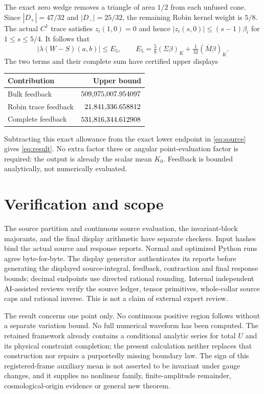 \documentclass[11pt]{article}
\begin{document}
The exact zero wedge removes a triangle of area $1/2$ from each unfused
cone. Since $|D_+|=47/32$ and $|D_-|=25/32$, the remaining Robin kernel
weight is $5/8$. The actual $C^1$ trace satisfies $z_i(1,0)=0$ and hence
$|z_i(s,0)|\le(s-1)\beta_i$ for $1\le s\le5/4$. It follows that
\[
|\lambda(W-S)(a,b)|\le E_5,
\qquad E_5=\tfrac58(\Sigma\beta)_K+\tfrac1{32}(\overline M\beta)_K.
\]
The two terms and their complete sum have certified upper displays
\begin{center}
\begin{tabular}{lr}\toprule
Contribution & Upper bound\\\midrule
Bulk feedback & $509{,}975{,}007.954097$\\
Robin trace feedback & $21{,}841{,}336.658812$\\
Complete feedback & $531{,}816{,}344.612908$\\\bottomrule
\end{tabular}
\end{center}
Subtracting this exact allowance from the exact lower endpoint in
\eqref{eq:source} gives \eqref{eq:result}. No extra factor three or angular
point-evaluation factor is required: the output is already the scalar mean
$K_0$. Feedback is bounded analytically, not numerically evaluated.

\section{Verification and scope}
The source partition and continuous source evaluation, the invariant-block
majorants, and the final display arithmetic have separate checkers. Input
hashes bind the actual source and response reports. Normal and optimized
Python runs agree byte-for-byte. The display generator authenticates its
reports before generating the displayed source-integral, feedback,
contraction and final response bounds;
decimal endpoints use directed rational rounding. Internal independent
AI-assisted reviews verify the source ledger, tensor primitives, whole-collar
source caps and rational inverse. This is not a claim of external expert review.

The result concerns one point only. No continuous positive region follows
without a separate variation bound. No full numerical waveform has been
computed. The retained framework already contains a conditional analytic
series for total $U$ and its physical constraint completion; the present
calculation neither replaces that construction nor repairs a purportedly
missing boundary law. The sign of this registered-frame auxiliary mean is
not asserted to be invariant under gauge changes, and it supplies no
nonlinear family, finite-amplitude remainder, cosmological-origin evidence
or general new theorem.
\end{document}
